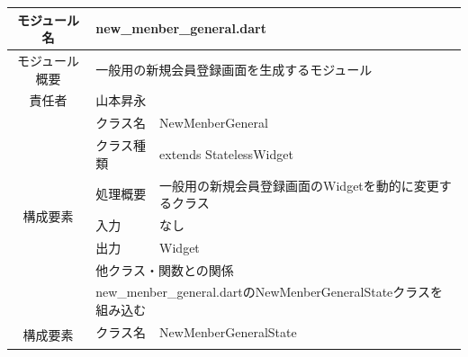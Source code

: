 \begin{table}[H]
  \centering
  \begin{tabular}{|c|l|l|} \hline
    モジュール名                & \multicolumn{2}{l|}{new\_menber\_general.dart}                                                                                                 \\ \hline
    モジュール概要               & \multicolumn{2}{p{12cm}|}{一般用の新規会員登録画面を生成するモジュール}                                                                                              \\ \hline
    責任者                   & \multicolumn{2}{l|}{山本昇永}                                                                                                                      \\ \hline
    \multirow{7}{*}{構成要素} & クラス名                                                                               & NewMenberGeneral                                          \\ \cline{2-3}
                          & クラス種類                                                                              & extends StatelessWidget                                   \\ \cline{2-3}
                          & 処理概要                                                                               & \multicolumn{1}{p{12cm}|}{一般用の新規会員登録画面のWidgetを動的に変更するクラス} \\ \cline{2-3}
                          & 入力                                                                                 & なし                                                        \\ \cline{2-3}
                          & 出力                                                                                 & Widget                                                    \\ \cline{2-3}
                          & \multicolumn{2}{l|}{他クラス・関数との関係}                                                                                                               \\ \cline{2-3}
                          & \multicolumn{2}{p{14cm}|}{new\_menber\_general.dartのNewMenberGeneralStateクラスを組み込む}                                                             \\ \hline
    \multirow{7}{*}{構成要素} & クラス名                                                                               & NewMenberGeneralState                                     \\ \cline{2-3}

\end{tabular}
\end{table}
